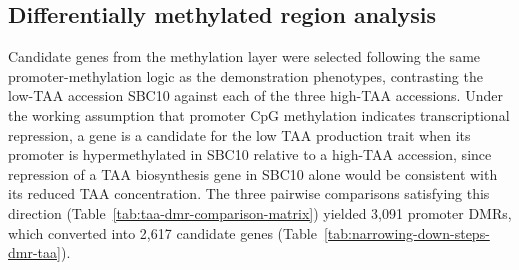 \subsection{Differentially methylated region analysis}
\hspace{1em}Candidate genes from the methylation layer were selected following the same promoter-methylation logic as the demonstration phenotypes, contrasting the low-TAA accession SBC10 against each of the three high-TAA accessions. Under the working assumption that promoter CpG methylation indicates transcriptional repression, a gene is a candidate for the low TAA production trait when its promoter is hypermethylated in SBC10 relative to a high-TAA accession, since repression of a TAA biosynthesis gene in SBC10 alone would be consistent with its reduced TAA concentration. The three pairwise comparisons satisfying this direction (Table~\ref{tab:taa-dmr-comparison-matrix}) yielded 3,091 promoter DMRs, which converted into 2,617 candidate genes (Table~\ref{tab:narrowing-down-steps-dmr-taa}).

